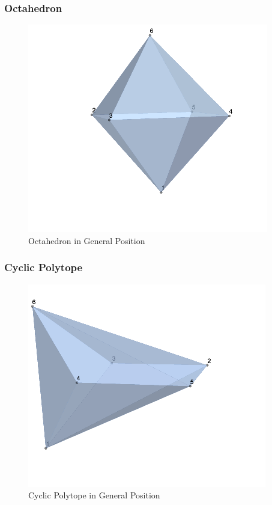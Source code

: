 \documentclass{beamer}
\begin{document}

\begin{frame}
\frametitle{Octahedron}
    \begin{figure}[h] %
        \includegraphics[scale = 0.4]{Octo.png} %
        \caption{Octahedron in General Position}
    \end{figure}
\end{frame}


\begin{frame}
\frametitle{Cyclic Polytope}
    \begin{figure}[h] %
        \includegraphics[scale = 0.4]{Cyclic.png} %
        \caption{Cyclic Polytope in General Position}
    \end{figure}
\end{frame}
\end{document}
